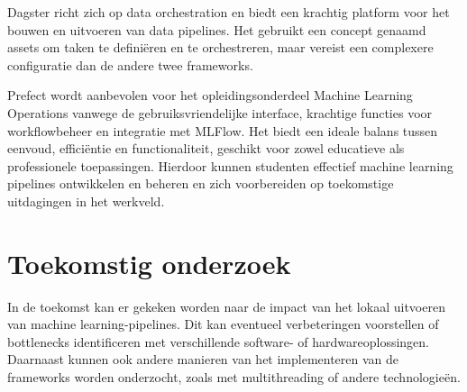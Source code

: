 \documentclass[a0,portrait]{hogent-poster}
\begin{document}
\begin{multicols}{2}
Dagster richt zich op data orchestration en biedt een krachtig platform voor het bouwen en uitvoeren van data pipelines. Het gebruikt een concept genaamd assets om taken te definiëren en te orchestreren, maar vereist een complexere configuratie dan de andere twee frameworks.

Prefect wordt aanbevolen voor het opleidingsonderdeel Machine Learning Operations vanwege de gebruiksvriendelijke interface, krachtige functies voor workflowbeheer en integratie met MLFlow. Het biedt een ideale balans tussen eenvoud, efficiëntie en functionaliteit, geschikt voor zowel educatieve als professionele toepassingen. Hierdoor kunnen studenten effectief machine learning pipelines ontwikkelen en beheren en zich voorbereiden op toekomstige uitdagingen in het werkveld.
\section{Toekomstig onderzoek}

In de toekomst kan er gekeken worden naar de impact van het lokaal uitvoeren van machine learning-pipelines. Dit kan eventueel verbeteringen voorstellen of bottlenecks identificeren met verschillende software- of hardwareoplossingen. Daarnaast kunnen ook andere manieren van het implementeren van de frameworks worden onderzocht, zoals met multithreading of andere technologieën.
\end{multicols}
\end{document}
